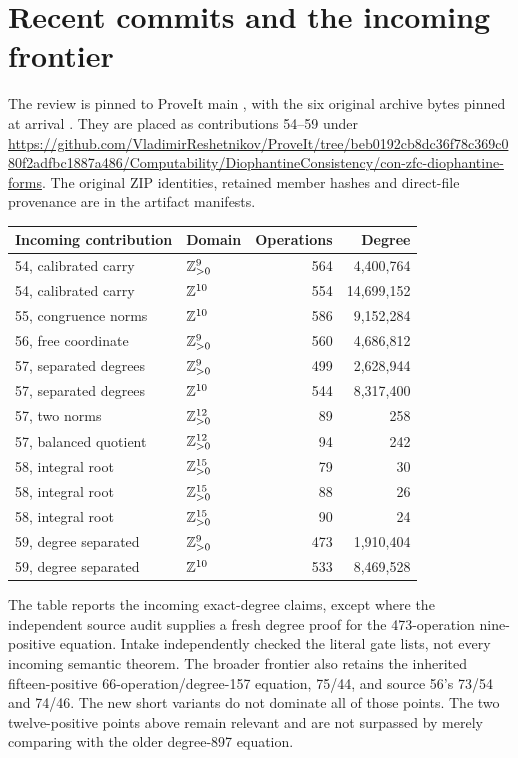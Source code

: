 \section{Recent commits and the incoming frontier}
The review is pinned to ProveIt main
, with the six original archive bytes pinned at arrival
.
They are placed as contributions 54--59 under
\url{https://github.com/VladimirReshetnikov/ProveIt/tree/beb0192cb8dc36f78c369c080f2adfbc1887a486/Computability/DiophantineConsistency/con-zfc-diophantine-forms}.
The original ZIP identities, retained member hashes and direct-file provenance are in the artifact manifests.

\begin{center}\small
\begin{tabular}{@{}p{4.0cm}lrr@{}}
\toprule
Incoming contribution & Domain & Operations & Degree\\\midrule
54, calibrated carry & $\mathbb Z_{>0}^9$ & 564 & 4,400,764\\
54, calibrated carry & $\mathbb Z^{10}$ & 554 & 14,699,152\\
55, congruence norms & $\mathbb Z^{10}$ & 586 & 9,152,284\\
56, free coordinate & $\mathbb Z_{>0}^9$ & 560 & 4,686,812\\
57, separated degrees & $\mathbb Z_{>0}^9$ & 499 & 2,628,944\\
57, separated degrees & $\mathbb Z^{10}$ & 544 & 8,317,400\\
57, two norms & $\mathbb Z_{>0}^{12}$ & 89 & 258\\
57, balanced quotient & $\mathbb Z_{>0}^{12}$ & 94 & 242\\
58, integral root & $\mathbb Z_{>0}^{15}$ & 79 & 30\\
58, integral root & $\mathbb Z_{>0}^{15}$ & 88 & 26\\
58, integral root & $\mathbb Z_{>0}^{15}$ & 90 & 24\\
59, degree separated & $\mathbb Z_{>0}^9$ & 473 & 1,910,404\\
59, degree separated & $\mathbb Z^{10}$ & 533 & 8,469,528\\\bottomrule
\end{tabular}
\end{center}
The table reports the incoming exact-degree claims, except where the independent source audit supplies a fresh degree proof for the 473-operation nine-positive equation. Intake independently checked the literal gate lists, not every incoming semantic theorem. The broader frontier also retains the inherited fifteen-positive 66-operation/degree-157 equation, 75/44, and source 56's 73/54 and 74/46. The new short variants do not dominate all of those points. The two twelve-positive points above remain relevant and are not surpassed by merely comparing with the older degree-897 equation.


